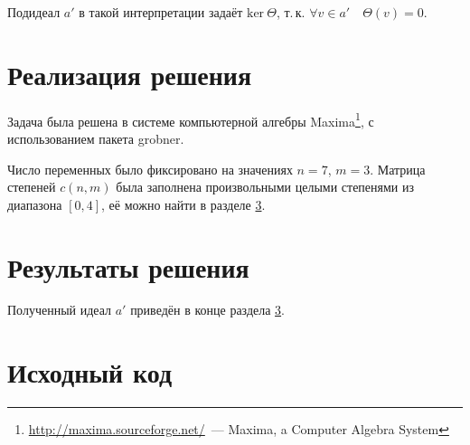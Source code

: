 \documentclass[a4paper,12pt]{article}
\begin{document}
Подидеал $a'$ в такой интерпретации задаёт $\textrm{ker}\ \Theta$, т.\,к. $\forall v \in a' \quad \Theta(v) = 0$.

\section{Реализация решения}
Задача была решена в системе компьютерной алгебры 
Maxima\footnote{\url{http://maxima.sourceforge.net/}~--- Maxima, a Computer Algebra System}, 
с использованием пакета grobner.

Число переменных было фиксировано на значениях $n = 7$, $m = 3$.
Матрица степеней $c(n, m)$ была заполнена произвольными целыми степенями из диапазона $[0, 4]$,
её можно найти в разделе \ref{sec:source-code}.

\section{Результаты решения}
Полученный идеал $a'$ приведён в конце раздела \ref{sec:source-code}.

\section{Исходный код}
\label{sec:source-code}

% 
\end{document}
